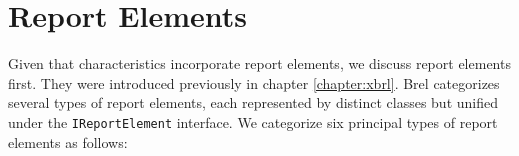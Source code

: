 \section{Report Elements}
\label{sec:api_report_elements}






Given that characteristics incorporate report elements, 
we discuss report elements first.
They were introduced previously in chapter \ref{chapter:xbrl}.
Brel categorizes several types of report elements, each represented by distinct classes but unified under the \texttt{IReportElement} interface.
We categorize six principal types of report elements as follows:

